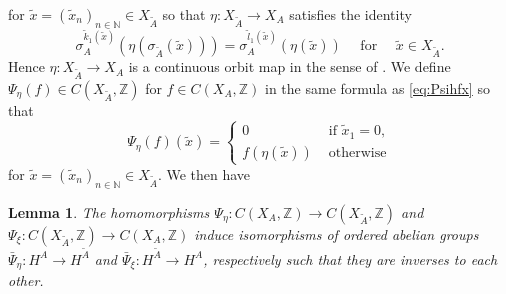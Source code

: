 \documentclass[11pt]{article}
\newtheorem{lemma}[theorem]{Lemma}
\theoremstyle{plain}
\theoremstyle{definition}
\numberwithin{equation}{section}
\newcommand{\N}{\mathbb{N}}
\newcommand{\Z}{\mathbb{Z}}
\begin{document}
for $\tilde{x} = (\tilde{x}_n)_{n \in \N} \in X_{\tilde{A}}$
so that 
$\eta:X_{\tilde{A}} \rightarrow X_A$
satisfies the identity
\begin{equation}
\sigma_A^{\tilde{k}_1(\tilde{x})}(\eta(\sigma_{\tilde{A}}(\tilde{x}))) 
= \sigma_A^{\tilde{l}_1(\tilde{x})}(\eta(\tilde{x}))
\quad \text{ for }
\quad 
\tilde{x} \in X_{\tilde{A}}. \label{eq: sigmatilde}
\end{equation}
Hence 
$\eta:X_{\tilde{A}} \rightarrow X_A$
is a continuous orbit map in the sense of 
\cite{MaPre2014}.
We define $\Psi_\eta(f)\in C(X_{\tilde{A}},\Z)$
for $f \in C(X_A,\Z)$
in the same formula as
\eqref{eq:Psihfx} so that
\begin{equation*}
\Psi_\eta(f)(\tilde{x}) =
\begin{cases}
0 & \text{ if } \tilde{x}_1 =0,\\
f(\eta(\tilde{x})) & \text{ otherwise}
\end{cases}
\end{equation*}
for $\tilde{x}=(\tilde{x}_n)_{n \in \N} \in X_{\tilde{A}}$.
We then have
\begin{lemma}\label{lem:Psietaxi}
The homomorphisms
$\Psi_\eta: C(X_A,\Z) \rightarrow C(X_{\tilde{A}},\Z)$
and
$\Psi_\xi: C(X_{\tilde{A}},\Z) \rightarrow C(X_A,\Z)$
induce isomorphisms of ordered abelian groups 
$\bar{\Psi}_\eta: H^A \rightarrow H^{\tilde{A}}$
and
$\bar{\Psi}_\xi: H^{\tilde{A}} \rightarrow H^A$,
respectively such that
they are inverses to each other.
\end{lemma}
\end{document}

